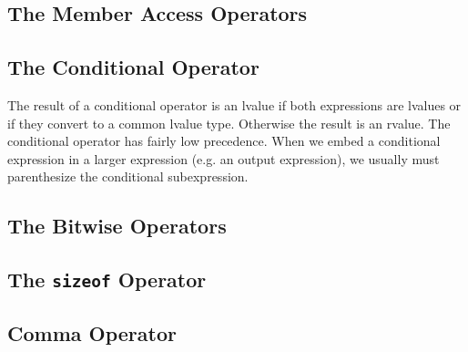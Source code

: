 \documentclass[11pt]{ctexart}
\begin{document}
\subsection{The Member Access Operators}
\subsection{The Conditional Operator}
The result of a conditional operator is an lvalue if both expressions are lvalues or if they convert to a common lvalue type. Otherwise the result is an rvalue. The conditional operator has fairly low precedence. When we embed a conditional expression in a larger expression (e.g. an output expression), we usually must parenthesize the conditional subexpression. 
\subsection{The Bitwise Operators}
\subsection{The \texttt{sizeof} Operator}
\subsection{Comma Operator}
\end{document}
